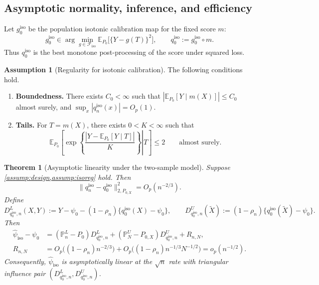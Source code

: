 \documentclass{article}
\theoremstyle{plain}
\newtheorem{theorem}{Theorem}
\theoremstyle{definition}
\newtheorem{assumption}{Assumption}
\newcommand{\E}{\mathbb{E}}
\newcommand{\1}{\mathbf{1}}
\newcommand{\mhat}{m}
\newcommand{\rhon}{\rho_n}
\newcommand{\Pl}{\mathbb{P}^{L}_n}
\newcommand{\Pu}{\mathbb{P}^{U}_N}
\newcommand{\Px}{P_{0,X}}
\begin{document}
\subsection{Asymptotic normality, inference, and efficiency}

Let \(g_0^{\mathrm{iso}}\) be the population isotonic calibration map for the fixed score
\(\mhat\):
\begin{equation}
\label{eq:pop-iso}
g_0^{\mathrm{iso}} \in \arg\min_{g\in\mathcal F_{\mathrm{iso}}}
\E_{P_0}\bigl[\{Y-g(T)\}^2\bigr],
\qquad
q_0^{\mathrm{iso}} := g_0^{\mathrm{iso}}\circ m .
\end{equation}
Thus \(q_0^{\mathrm{iso}}\) is the best monotone post-processing of the score
under squared loss.

\begin{assumption}[Regularity for isotonic calibration]
\label{assump:isoreg}
The following conditions hold.
\begin{enumerate}[leftmargin=6mm,label=(\roman*)]
\item \textbf{Boundedness.} There exists \(C_0<\infty\) such that
\(|\E_{P_0}[Y\mid \mhat(X)]|\le C_0\) almost surely, and
\(\sup_x |q_n^{\mathrm{iso}}(x)|=O_p(1)\).
\item \textbf{Tails.} For \(T=\mhat(X)\), there exists \(0<K<\infty\) such that
\[
\E_{P_0}\left[\left.\exp\left\{\frac{|Y-\E_{P_0}[Y\mid T]|}{K}\right\}\right|T\right]
\le 2\qquad\text{almost surely}.
\]
\label{cond::subgaus}
\end{enumerate}
\end{assumption}

\begin{theorem}[Asymptotic linearity under the two-sample model]
\label{thm:al}
Suppose \cref{assump:design,assump:isoreg} hold. Then
\[
\|q_n^{\mathrm{iso}}-q_0^{\mathrm{iso}}\|_{2,\Px}^2
=
O_p(n^{-2/3}).
\]
Define
\[
D_{q_0^{\mathrm{iso}},n}^L(X,Y)
:=
Y-\psi_0-(1-\rhon)\{q_0^{\mathrm{iso}}(X)-\psi_0\},
\qquad
D_{q_0^{\mathrm{iso}},n}^U(\widetilde X)
:=
(1-\rhon)\{q_0^{\mathrm{iso}}(\widetilde X)-\psi_0\}.
\]
Then
\begin{align}
\widehat{\psi}_{\mathrm{iso}}-\psi_0
&=
(\Pl-P_0)D_{q_0^{\mathrm{iso}},n}^L
+
(\Pu-\Px)D_{q_0^{\mathrm{iso}},n}^U
+
R_{n,N},
\label{eq:al}\\
R_{n,N}
&=
O_p\bigl((1-\rhon)n^{-2/3}\bigr)
+
O_p\bigl((1-\rhon)n^{-1/3}N^{-1/2}\bigr)
=o_p(n^{-1/2}).
\nonumber
\end{align}
Consequently, $\widehat{\psi}_{\mathrm{iso}}$ is
asymptotically linear at the $\sqrt n$ rate with triangular
influence pair $(D_{q_0^{\mathrm{iso}},n}^L,D_{q_0^{\mathrm{iso}},n}^U)$.
\end{theorem}
\end{document}
